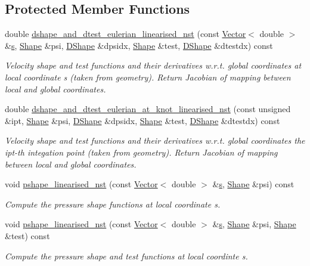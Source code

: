 \subsection*{Protected Member Functions}
\begin{DoxyCompactItemize}
\item 
double \hyperlink{classoomph_1_1LinearisedQTaylorHoodElement_ae6cdd6036b58e98ddabffddb645270be}{dshape\+\_\+and\+\_\+dtest\+\_\+eulerian\+\_\+linearised\+\_\+nst} (const \hyperlink{classoomph_1_1Vector}{Vector}$<$ double $>$ \&\hyperlink{cfortran_8h_ab7123126e4885ef647dd9c6e3807a21c}{s}, \hyperlink{classoomph_1_1Shape}{Shape} \&psi, \hyperlink{classoomph_1_1DShape}{D\+Shape} \&dpsidx, \hyperlink{classoomph_1_1Shape}{Shape} \&test, \hyperlink{classoomph_1_1DShape}{D\+Shape} \&dtestdx) const
\begin{DoxyCompactList}\small\item\em Velocity shape and test functions and their derivatives w.\+r.\+t. global coordinates at local coordinate s (taken from geometry). Return Jacobian of mapping between local and global coordinates. \end{DoxyCompactList}\item 
double \hyperlink{classoomph_1_1LinearisedQTaylorHoodElement_a03f34e02301c483325c4d77ed714ad56}{dshape\+\_\+and\+\_\+dtest\+\_\+eulerian\+\_\+at\+\_\+knot\+\_\+linearised\+\_\+nst} (const unsigned \&ipt, \hyperlink{classoomph_1_1Shape}{Shape} \&psi, \hyperlink{classoomph_1_1DShape}{D\+Shape} \&dpsidx, \hyperlink{classoomph_1_1Shape}{Shape} \&test, \hyperlink{classoomph_1_1DShape}{D\+Shape} \&dtestdx) const
\begin{DoxyCompactList}\small\item\em Velocity shape and test functions and their derivatives w.\+r.\+t. global coordinates the ipt-\/th integation point (taken from geometry). Return Jacobian of mapping between local and global coordinates. \end{DoxyCompactList}\item 
void \hyperlink{classoomph_1_1LinearisedQTaylorHoodElement_a948a02f3480faa9439fb72932e344dcf}{pshape\+\_\+linearised\+\_\+nst} (const \hyperlink{classoomph_1_1Vector}{Vector}$<$ double $>$ \&\hyperlink{cfortran_8h_ab7123126e4885ef647dd9c6e3807a21c}{s}, \hyperlink{classoomph_1_1Shape}{Shape} \&psi) const
\begin{DoxyCompactList}\small\item\em Compute the pressure shape functions at local coordinate s. \end{DoxyCompactList}\item 
void \hyperlink{classoomph_1_1LinearisedQTaylorHoodElement_a468b7ce0892709fada4b19acf74646e7}{pshape\+\_\+linearised\+\_\+nst} (const \hyperlink{classoomph_1_1Vector}{Vector}$<$ double $>$ \&\hyperlink{cfortran_8h_ab7123126e4885ef647dd9c6e3807a21c}{s}, \hyperlink{classoomph_1_1Shape}{Shape} \&psi, \hyperlink{classoomph_1_1Shape}{Shape} \&test) const
\begin{DoxyCompactList}\small\item\em Compute the pressure shape and test functions at local coordinte s. \end{DoxyCompactList}\end{DoxyCompactItemize}
